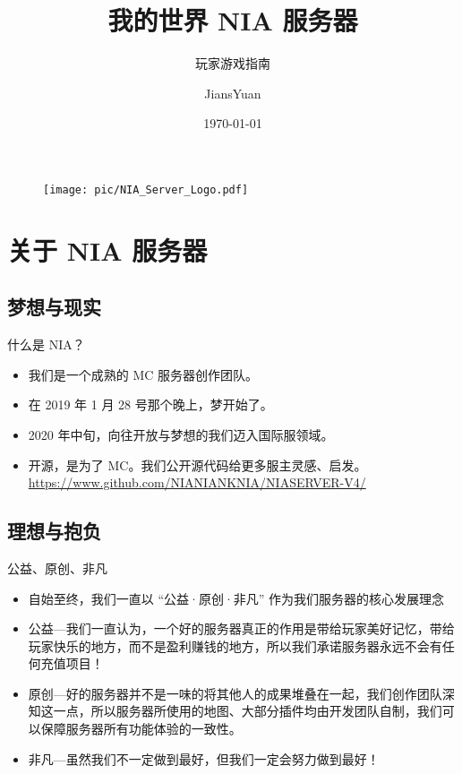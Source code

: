 \documentclass{beamer}
\author{\calligra JiansYuan}
\title{我的世界 NIA 服务器}
\subtitle{玩家游戏指南}
\institute{NIA Server Research \& Development Group}
\date{\today}
\begin{document}
\kaishu
\begin{frame} 
    \titlepage
    \begin{figure}[htpb]
        \begin{center}
            \texttt{[image: pic/NIA\_Server\_Logo.pdf]}
        \end{center} 
    \end{figure}
\end{frame}

\begin{frame}
    \tableofcontents[sectionstyle=show,subsectionstyle=show/shaded/hide,subsubsectionstyle=show/shaded/hide]
\end{frame}


\section{关于 NIA 服务器} 

\subsection{梦想与现实}
\begin{frame}{什么是 NIA？}
    \begin{itemize}[<+-| alert@+>]
        \item 我们是一个成熟的 MC 服务器创作团队。
        \item 在 2019 年 1 月 28 号那个晚上，梦开始了。
        \item 2020 年中旬，向往开放与梦想的我们迈入国际服领域。
        \item 开源，是为了 MC。\newline 我们公开源代码给更多服主灵感、启发。 \newline \url{https://www.github.com/NIANIANKNIA/NIASERVER-V4/}
    \end{itemize}
\end{frame}

\subsection{理想与抱负}
\begin{frame}{公益、原创、非凡}
    \begin{itemize}[<+-| alert@+>]
        \item 自始至终，我们一直以 “公益·原创·非凡” 作为我们服务器的核心发展理念
        \item 公益---我们一直认为，一个好的服务器真正的作用是带给玩家美好记忆，带给玩家快乐的地方，而不是盈利赚钱的地方，所以我们承诺服务器永远不会有任何充值项目！  
        \item 原创---好的服务器并不是一味的将其他人的成果堆叠在一起，我们创作团队深知这一点，所以服务器所使用的地图、大部分插件均由开发团队自制，我们可以保障服务器所有功能体验的一致性。
        \item 非凡---虽然我们不一定做到最好，但我们一定会努力做到最好！
    \end{itemize}
\end{frame}
\end{document}
